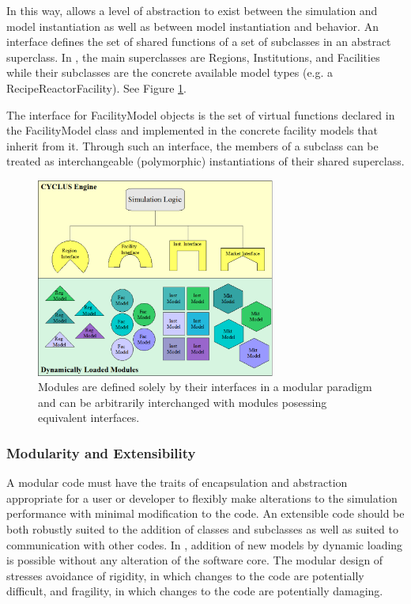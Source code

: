In this way, \Cyclus allows a level of abstraction to exist between the 
simulation and model instantiation as well as between model instantiation and 
behavior.  An interface defines the set of shared functions of a set of 
subclasses in an abstract superclass. In \Cyclus, the main superclasses are 
Regions, Institutions, and Facilities while their subclasses are the concrete 
available model types (e.g. a RecipeReactorFacility). See Figure 
\ref{fig:modularity}.

The interface for FacilityModel objects is the set of 
virtual functions declared in the FacilityModel class and implemented in the 
concrete facility models that inherit from it. Through 
such an interface, the members of a subclass can be treated as 
interchangeable (polymorphic) instantiations of their shared 
superclass. 

\begin{figure}[htb!]
  \begin{center}
    \includegraphics[width=0.7\textwidth]{./chapters/paradigm/modularity.png}
  \end{center}
  \caption[Module Interfaces and Encapsulation in \Cyclus.]{Modules are defined solely 
  by their interfaces in a modular paradigm and can be arbitrarily 
  interchanged with modules posessing equivalent interfaces.}
  \label{fig:modularity}
\end{figure}


\subsubsection{Modularity and Extensibility}

A modular code must have the traits of encapsulation and abstraction 
appropriate for a user or developer to flexibly make alterations to 
the simulation performance with minimal modification to the code. An 
extensible code should be both robustly suited to the addition of 
classes and subclasses as well as suited to communication with other codes.
In \Cyclus, addition of new models by dynamic loading is possible without 
any alteration of the software core. The modular design of \Cyclus stresses
avoidance of rigidity, in which changes to the code are potentially difficult, 
and fragility, in which changes to the code are potentially damaging.

